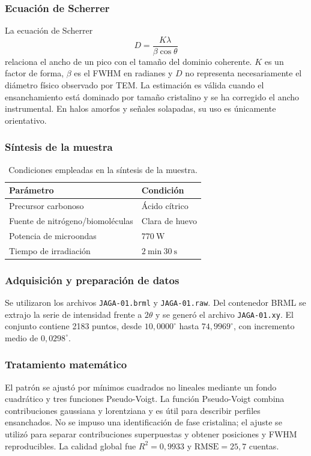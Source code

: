 \subsubsection{Ecuación de Scherrer}
La ecuación de Scherrer
\begin{equation}
	D=\frac{K\lambda}{\beta\cos\theta}
	\label{eq:scherrer}
\end{equation}
relaciona el ancho de un pico con el tamaño del dominio coherente. \(K\) es un factor de forma, \(\beta\) es el FWHM en radianes y \(D\) no representa necesariamente el diámetro físico observado por TEM. La estimación es válida cuando el ensanchamiento está dominado por tamaño cristalino y se ha corregido el ancho instrumental. En halos amorfos y señales solapadas, su uso es únicamente orientativo.
\subsubsection{Síntesis de la muestra}
\begin{table}[H]
	\centering
	\caption{Condiciones empleadas en la síntesis de la muestra.}
	\label{tab:sintesis}
	\begin{tabular}{l l}
		\hline
		\textbf{Parámetro} & \textbf{Condición} \\
		\hline
		Precursor carbonoso & Ácido cítrico \\
		Fuente de nitrógeno/biomoléculas & Clara de huevo \\
		Potencia de microondas & \(770\ \mathrm{W}\) \\
		Tiempo de irradiación & \(2\ \mathrm{min}\ 30\ \mathrm{s}\) \\
		\hline
	\end{tabular}
\end{table}
\subsubsection{Adquisición y preparación de datos}
Se utilizaron los archivos \texttt{JAGA-01.brml} y \texttt{JAGA-01.raw}. Del contenedor BRML se extrajo la serie de intensidad frente a \(2\theta\) y se generó el archivo \texttt{JAGA-01.xy}. El conjunto contiene 2183 puntos, desde \(10{,}0000^\circ\) hasta \(74{,}9969^\circ\), con incremento medio de \(0{,}0298^\circ\).
\subsubsection{Tratamiento matemático}
El patrón se ajustó por mínimos cuadrados no lineales mediante un fondo cuadrático y tres funciones Pseudo-Voigt. La función Pseudo-Voigt combina contribuciones gaussiana y lorentziana y es útil para describir perfiles ensanchados. No se impuso una identificación de fase cristalina; el ajuste se utilizó para separar contribuciones superpuestas y obtener posiciones y FWHM reproducibles. La calidad global fue \(R^2=0{,}9933\) y \(\mathrm{RMSE}=25{,}7\) cuentas.


